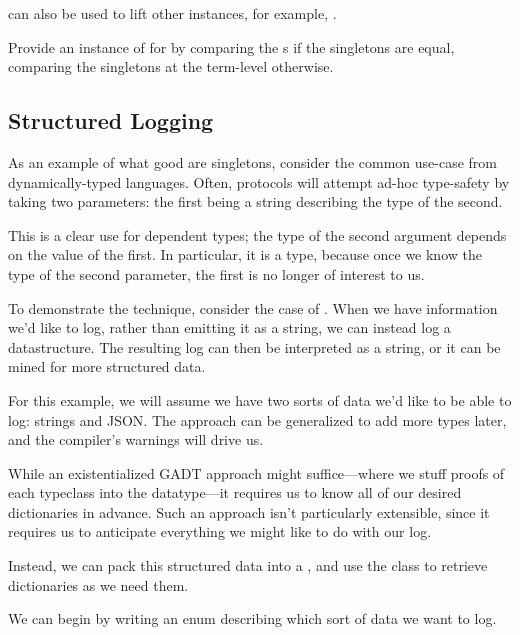 \documentclass[book.tex]{subfiles}
\begin{document}
 can also be used to lift other instances, for example, .


\begin{exercise}
Provide an instance of  for  by comparing the
s if the singletons are equal, comparing the singletons at the term-level
otherwise.
\end{exercise}
\begin{solution}
\end{solution}


\subsection{Structured Logging}

As an example of what good are singletons, consider the common use-case from
dynamically-typed languages. Often, protocols will attempt ad-hoc type-safety
by taking two parameters: the first being a string describing the type of the
second.

This is a clear use for dependent types; the type of the second argument depends
on the value of the first. In particular, it is a  type, because once
we know the type of the second parameter, the first is no longer of interest to
us.

To demonstrate the technique, consider the case of .
When we have information we'd like to log, rather than emitting it as a string,
we can instead log a datastructure. The resulting log can then be interpreted as
a string, or it can be mined for more structured data.

For this example, we will assume we have two sorts of data we'd like to be
able to log: strings and JSON. The approach can be generalized to add more types
later, and the compiler's warnings will drive us.

While an existentialized GADT approach might suffice---where we stuff proofs of
each typeclass into the datatype---it requires us to know all of our desired
dictionaries in advance. Such an approach isn't particularly extensible, since
it requires us to anticipate everything we might like to do with our log.

Instead, we can pack this structured data into a , and use the
 class to retrieve dictionaries as we need them.

We can begin by writing an enum describing which sort of data we want to log.
\end{document}
